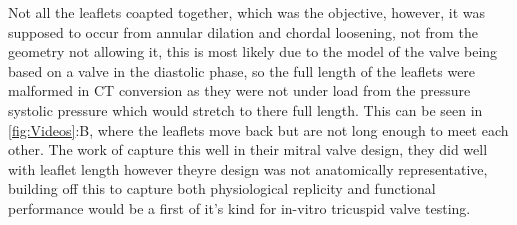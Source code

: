 Not all the leaflets coapted together, which was the objective, however, it was supposed to occur from annular dilation and chordal loosening, not from the geometry not allowing it, this is most likely due to the model of the valve being based on a valve in the diastolic phase, so the full length of the leaflets were malformed in \gls{CT} conversion as they were not under load from the pressure systolic pressure which would stretch to there full length. This can be seen in \cref{fig:Videos}:B, where the leaflets move back but are not long enough to meet each other. The work of  capture this well in their mitral valve design, they did well with leaflet length however theyre design was not anatomically representative, building off this to capture both physiological replicity and functional performance would be a first of it's kind for in-vitro tricuspid valve testing.




